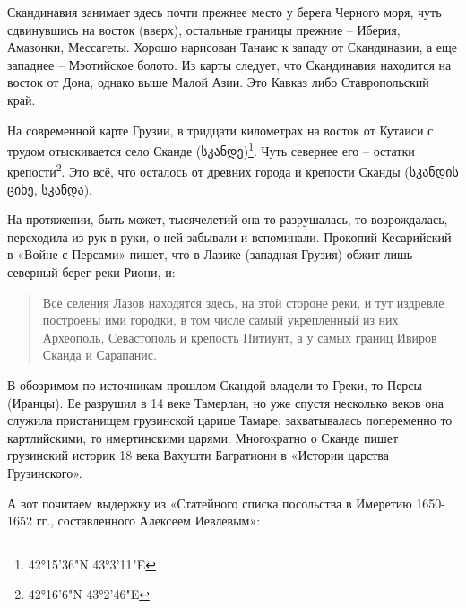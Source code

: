 Скандинавия занимает здесь почти прежнее место у берега Черного моря, чуть сдвинувшись на восток (вверх), остальные границы прежние – Иберия, Амазонки, Мессагеты. Хорошо нарисован Танаис к западу от Скандинавии, а еще западнее – Мэотийское болото. Из карты следует, что Скандинавия находится на восток от Дона, однако выше Малой Азии. Это Кавказ либо Ставропольский край.

На современной карте Грузии, в тридцати километрах на восток от Кутаиси с трудом отыскивается село Сканде (სკანდე)\footnote{42°15'36"N 43°3'11"E}. Чуть севернее его – остатки крепости\footnote{42°16'6"N 43°2'46"E}. Это всё, что осталось от древних города и крепости Сканды (სკანდის ციხე, სკანდა).

На протяжении, быть может, тысячелетий она то разрушалась, то возрождалась, переходила из рук в руки, о ней забывали и вспоминали. Прокопий Кесарийский в «Войне с Персами» пишет, что в Лазике (западная Грузия) обжит лишь северный берег реки Риони, и:

\begin{quotation}
Все селения Лазов находятся здесь, на этой стороне реки, и тут издревле построены ими городки, в том числе самый укрепленный из них Археополь, Севастополь и крепость Питиунт, а у самых границ Ивиров Сканда и Сарапанис.
\end{quotation}

В обозримом по источникам прошлом Скандой владели то Греки, то Персы (Иранцы). Ее разрушил в 14 веке Тамерлан, но уже спустя несколько веков она служила пристанищем грузинской царице Тамаре, захватывалась попеременно то картлийскими, то имертинскими царями. Многократно о Сканде пишет грузинский историк 18 века Вахушти Багратиони в «Истории царства Грузинского».

А вот почитаем выдержку из «Статейного списка посольства в Имеретию 1650-1652 гг., составленного Алексеем Иевлевым»:


